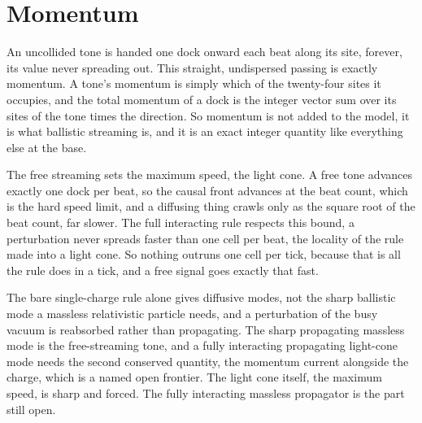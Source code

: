 \section{Momentum}

An uncollided tone is handed one dock onward each beat along its site, forever, its value never spreading out. This
straight, undispersed passing is exactly momentum. A tone's momentum is simply which of the twenty-four sites it
occupies, and the total momentum of a dock is the integer vector sum over its sites of the tone times the direction. So momentum is not added to
the model, it is what ballistic streaming is, and it is an exact integer quantity like everything else at the base.

The free streaming sets the maximum speed, the light cone. A free tone advances exactly one dock per beat, so the causal
front advances at the beat count, which is the hard speed limit, and a diffusing thing crawls only as the square root of
the beat count, far slower. The full interacting rule respects this bound, a perturbation never spreads faster than one
cell per beat, the locality of the rule made into a light cone. So nothing outruns one cell per tick, because that is all
the rule does in a tick, and a free signal goes exactly that fast.

The bare single-charge rule alone gives diffusive modes, not
the sharp ballistic mode a massless relativistic particle needs, and a perturbation of the busy vacuum is reabsorbed
rather than propagating. The sharp propagating massless mode is the free-streaming tone, and a fully interacting
propagating light-cone mode needs the second conserved quantity, the momentum current alongside the charge, which is a
named open frontier. The light cone itself, the maximum speed, is sharp and forced. The fully interacting massless
propagator is the part still open.
